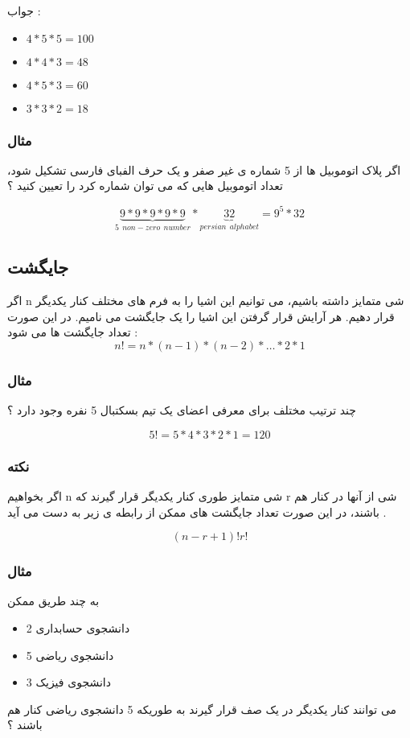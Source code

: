 \documentclass[12pt]{book}
\begin{document}
جواب :
\begin{LTR}
\begin{itemize}
	\item $4 * 5 * 5 = 100$
	\item $4 * 4 * 3 = 48$
	\item $4 * 5 * 3 = 60$
	\item $3 * 3 * 2 = 18$
\end{itemize}
\end{LTR}



\subsubsection{مثال}
اگر پلاک اتوموبیل ها از 5 شماره ی غیر صفر و یک حرف الفبای فارسی تشکیل شود، تعداد اتوموبیل هایی که می توان شماره کرد را تعیین کنید ؟

$$
\underbrace{9 * 9 * 9 * 9 * 9}_{5 \:\: non-zero \:\: number} * \underbrace{32}_{persian \:\: alphabet} = 9^{5} * 32
$$


\subsection{جایگشت}

اگر n شی متمایز داشته باشیم، می توانیم این اشیا را به فرم های مختلف کنار یکدیگر قرار دهیم. هر آرایش قرار گرفتن این اشیا را یک جایگشت می نامیم. در این صورت تعداد جایگشت ها می شود :
$$
n! = n * (n-1) * (n-2) * \dots * 2 * 1
$$


\subsubsection{مثال}
چند ترتیب مختلف برای معرفی اعضای یک تیم بسکتبال 5 نفره وجود دارد ؟

$$
5! = 5 * 4 * 3 * 2 * 1 = 120
$$


\subsubsection{نکته}
اگر بخواهیم n شی متمایز طوری کنار یکدیگر قرار گیرند که r شی از آنها در کنار هم باشند، در این صورت تعداد جایگشت های ممکن از رابطه ی زیر به دست می آید .

$$
(n-r+1)! r!
$$


\subsubsection{مثال}
به چند طریق ممکن
\begin{itemize}
	\item 2 دانشجوی حسابداری
	\item 5 دانشجوی ریاضی
	\item 3 دانشجوی فیزیک
\end{itemize}
می توانند کنار یکدیگر در یک صف قرار گیرند به طوریکه 5 دانشجوی ریاضی کنار هم باشند ؟
\end{document}

